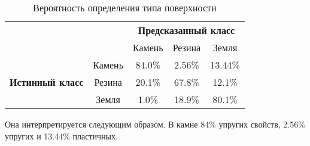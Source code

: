 \begin{table}[H]
    \caption{Вероятность определения типа поверхности}
    \label{tabular:prob_terrain_classification}
    \centering
\begin{tabular}{|c|c|c|c|c|} 
    \cline{3-5}
    \multicolumn{1}{l}{} & \multicolumn{1}{l|}{} & \multicolumn{3}{c|}{\textbf{Предсказанный класс}} \\ 
    \cline{3-5}
    \multicolumn{1}{l}{} &  & Камень & Резина & Земля \\ 
    \hline
    \multirow{3}{*}{{\textbf{Истинный класс}}} & Камень & {\cellcolor[rgb]{0.741,0.843,0.929}}84.0\% & 2.56\% & 13.44\% \\ 
    \hhline{|~----|}
     & Резина & 20.1\% & {\cellcolor[rgb]{0.741,0.843,0.929}}67.8\% & 12.1\% \\ 
    \hhline{|~----|}
     & Земля & 1.0\% & 18.9\% & {\cellcolor[rgb]{0.741,0.843,0.929}}80.1\% \\
    \hline
    \end{tabular}
\end{table}

Она интерпретируется следующим образом. В камне 84\% упругих свойств, 2.56\% упругих и 13.44\% пластичных.